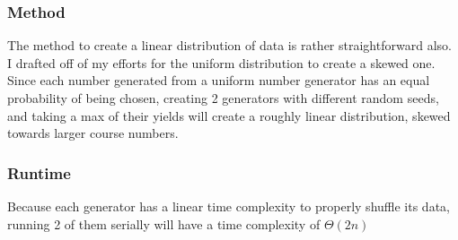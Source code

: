 \documentclass[11pt]{article}
\begin{document}
        \subsubsection{Method}
            The method to create a linear distribution of data is rather straightforward also. I drafted off of my efforts for the uniform distribution to create a skewed one. Since each number generated from a uniform number generator has an equal probability of being chosen, creating 2 generators with different random seeds, and taking a max of their yields will create a roughly linear distribution, skewed towards larger course numbers.
        \subsubsection{Runtime}
             Because each generator has a linear time complexity to properly shuffle its data, running 2 of them serially will have a time complexity of $\Theta(2n)$
\end{document}

